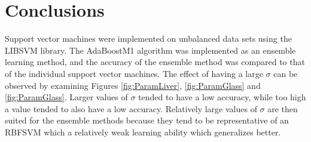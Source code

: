 \section{Conclusions}
\label{sec:Conclusions}

Support vector machines were implemented on unbalanced data sets using the LIBSVM library.
The AdaBoostM1 algorithm was implemented as an ensemble learning method, and the accuracy of the ensemble method was compared to that of the individual support vector machines.
The effect of having a large $\sigma$ can be observed by examining Figures \ref{fig:ParamLiver}, \ref{fig:ParamGlass} and \ref{fig:ParamGlass}.
Larger values of $\sigma$ tended to have a low accuracy, while too high a value tended to also have a low accuracy. 
Relatively large values of $\sigma$ are then suited for the ensemble methods because they tend to be representative of an RBFSVM which a relatively weak learning ability which generalizes better.
